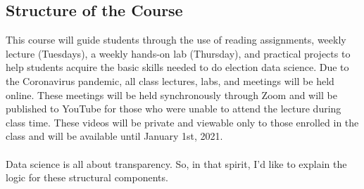 \documentclass[11pt]{article}
\begin{document}
\subsection{Structure of the Course}
This course will guide students through the use of reading assignments, weekly lecture (Tuesdays), a weekly hands-on lab (Thursday), and practical projects to help students acquire the basic skills needed to do election data science. Due to the Coronavirus pandemic, all class lectures, labs, and meetings will be held online. These meetings will be held synchronously through Zoom and will be published to YouTube for those who were unable to attend the lecture during class time. These videos will be private and viewable only to those enrolled in the class and will be available until January 1st, 2021. 
\\\\
Data science is all about transparency. So, in that spirit, I'd like to explain the logic for these structural components. 
\end{document}
